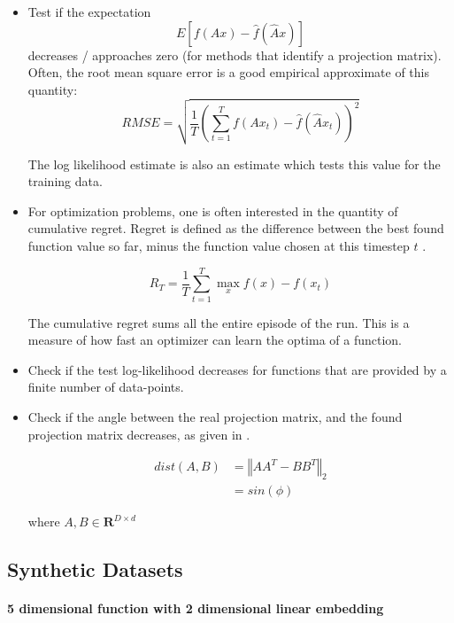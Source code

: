 \begin{itemize}
\item Test if the expectation $$ E[ f(A x) - \hat{f}(\hat{A} x) ] $$ decreases / approaches zero (for methods that identify a projection matrix).
Often, the root mean square error is a good empirical approximate of this quantity:
\begin{equation}
RMSE = \sqrt{ \frac{1}{T} (\sum_{t=1}^{T} f(A x_t) - \hat{f}(\hat{A} x_t))^2 }
\end{equation}

The log likelihood estimate is also an estimate which tests this value for the training data.

\item For optimization problems, one is often interested in the quantity of cumulative regret.
Regret is defined as the difference between the best found function value so far, minus the function value chosen at this timestep $t$ \citep{RegretDef}.

\begin{equation}
R_T = \frac{1}{T} \sum_{t=1}^{T} \max_x f(x) - f(x_t)
\end{equation}

The cumulative regret sums all the entire episode of the run.
This is a measure of how fast an optimizer can learn the optima of a function.

\item Check if the test log-likelihood decreases for functions that are provided by a finite number of data-points.

\item Check if the angle between the real projection matrix, and the found projection matrix decreases, as given in \citep{AngleMeasurement}. 

\begin{align}
dist(A, B) &= \left\Vert A A^T - B B^T\right\Vert_2 \\
& = sin( \phi )
\end{align}

where $ A, B \in \mathbf{R}^{D \times d}  $
\end{itemize}


\subsection{Synthetic Datasets} \label{syntheticFunction}
\paragraph{5 dimensional function with 2 dimensional linear embedding}

